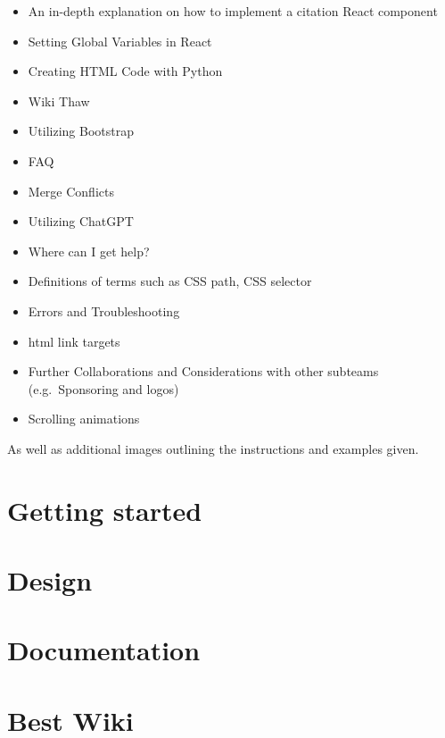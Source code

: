 \documentclass[a4paper, 11pt, twoside]{book}
\begin{document}
\begin{itemize}
    \item An in-depth explanation on how to implement a citation React component
    \item Setting Global Variables in React
    \item Creating HTML Code with Python
    \item Wiki Thaw
    \item Utilizing Bootstrap
    \item FAQ
    \item Merge Conflicts
    \item Utilizing ChatGPT
    \item Where can I get help?
    \item Definitions of terms such as CSS path, CSS selector
    \item Errors and Troubleshooting
    \item html link targets
    \item Further Collaborations and Considerations with other subteams (e.g.\ Sponsoring and logos)
    \item Scrolling animations
\end{itemize}
As well as additional images outlining the instructions and examples given.
\newpage

\mainmatter
\pagecolor{pgcolor}
\chapter{Getting started} \label{ch:started}

\newpage
\chapter{Design} \label{ch:design}

\newpage
\chapter{Documentation} \label{ch:docu}

\newpage
%
\chapter{Best Wiki} \label{ch:bestwiki}
%
\newpage
\end{document}
